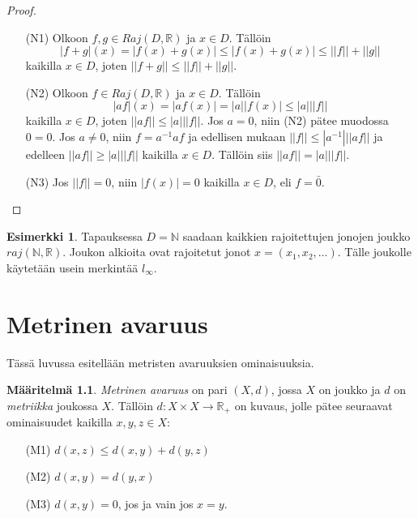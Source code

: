 \documentclass[12pt,a4paper,leqno]{report}
\newcommand{\R}{\mathbb{R}}
\newcommand{\N}{\mathbb{N}}
\theoremstyle{plain}
\theoremstyle{definition}
\newtheorem{maar}[equation]{Määritelmä}
\newtheorem{esim}[equation]{Esimerkki}
\theoremstyle{remark}
\begin{document}
\begin{proof}
\begin{itemize}
\item[(N1)] Olkoon $f,g\in Raj(D,\R )$ ja $x\in D$. Tällöin
\begin{equation*}
|f+g|(x)=|f(x)+g(x)|\leq|f(x)+g(x)|\leq||f||+||g||
\end{equation*}
kaikilla $x\in D$, joten $||f+g||\leq||f||+||g||$.

\item[(N2)] Olkoon $f\in Raj(D,\R )$ ja $x\in D$. Tällöin
\begin{equation*}
|af|(x)=|af(x)|=|a||f(x)|\leq|a|||f||
\end{equation*}
kaikilla $x\in D$, joten $||af||\leq|a|||f||$. Jos $a=0$, niin (N2) pätee muodossa $0=0$. %
Jos $a\neq 0$, niin $f=a^{-1}af$ ja edellisen
mukaan $||f||\leq|a^{-1}|||af||$
ja edelleen $||af||\geq|a|||f||$ kaikilla $x\in D$. Tällöin siis $||af||=|a|||f||$.

\item[(N3)]Jos $||f||=0$, niin $|f(x)|=0$ kaikilla $x\in D$, eli  $f=\bar{0}$.
\end{itemize} 
\end{proof}

\begin{esim}
Tapauksessa $D=\N$ saadaan kaikkien rajoitettujen jonojen joukko $raj(\N,\R).$ Joukon alkioita ovat rajoitetut jonot $x=(x_1,x_2,\dots).$ Tälle joukolle käytetään usein merkintää $l_\infty$.

\end{esim}


\chapter{Metrinen avaruus}\label{metrinen}
Tässä luvussa esitellään metristen avaruuksien ominaisuuksia.
\begin{maar} \emph{Metrinen avaruus} 
on pari $(X,d)$, jossa $X$ on joukko ja $d$ on \emph{metriikka} joukossa $X$.
Tällöin $d\colon X\times X\rightarrow \R_+$ on kuvaus, jolle pätee seuraavat ominaisuudet kaikilla $x,y,z\in X$:
\begin{itemize}
\item[(M1)]$d(x,z)\leq d(x,y)+d(y,z)$
\item[(M2)]$d(x,y)=d(y,x)$
\item[(M3)]$d(x,y)=0$, jos ja vain jos $x=y$.
\end{itemize} 
\end{maar} 
\end{document}
